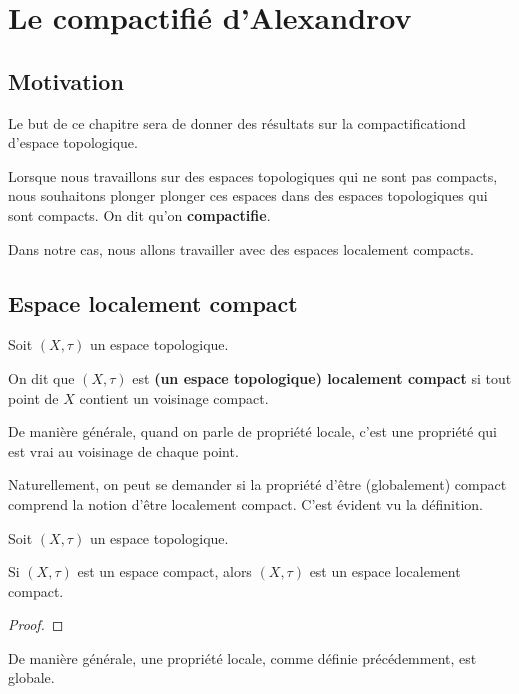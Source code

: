\chapter{Le compactifié d'Alexandrov}

\section*{Motivation}

Le but de ce chapitre sera de donner des résultats sur la compactificationd
d'espace topologique.

Lorsque nous travaillons sur des espaces topologiques qui ne sont pas compacts,
nous souhaitons plonger plonger ces espaces dans des espaces topologiques qui
sont compacts. On dit qu'on \textbf{compactifie}.

Dans notre cas, nous allons travailler avec des espaces localement compacts.

\section{Espace localement compact}

\begin{definition}
	Soit $(X, \tau)$ un espace topologique.

	On dit que $(X, \tau)$ est \textbf{(un espace topologique) localement
	compact} si tout point de $X$ contient un voisinage compact.
\end{definition}

\begin{remarque}
	De manière générale, quand on parle de propriété locale, c'est une propriété
	qui est vrai au voisinage de chaque point.
\end{remarque}

Naturellement, on peut se demander si la propriété d'être (globalement) compact comprend la
notion d'être localement compact. C'est évident vu la définition.

\begin{proposition}
	Soit $(X, \tau)$ un espace topologique.

	Si $(X, \tau)$ est un espace compact, alors $(X, \tau)$ est un espace
	localement compact.
\end{proposition}

\ifdefined\outputproof
\begin{proof}

\end{proof}
\fi

\begin{remarque}
	De manière générale, une propriété locale, comme définie précédemment, est
	globale.
\end{remarque}

